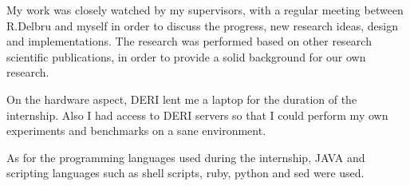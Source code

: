 My work was closely watched by my supervisors, with a regular meeting between
R.Delbru and myself in order to discuss the progress, new research ideas,
design and implementations. The research was performed based on other research
scientific publications, in order to provide a solid background for our own
research.

On the hardware aspect, DERI lent me a laptop for the duration of the
internship. Also I had access to DERI servers so that I could perform my own
experiments and benchmarks on a sane environment.

As for the programming languages used during the internship, JAVA and scripting
languages such as shell scripts, ruby, python and sed were used.

